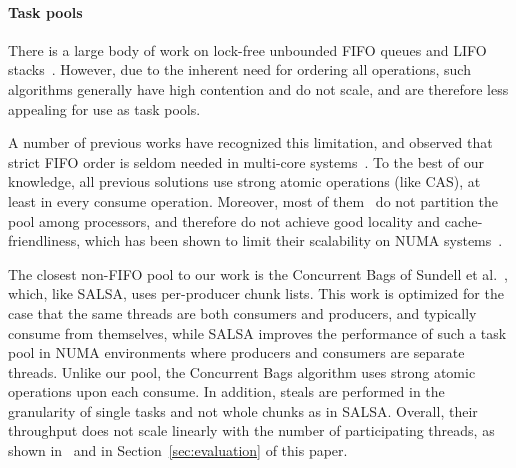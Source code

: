\paragraph{Task pools}
There is a large body of work on lock-free unbounded FIFO queues and LIFO
stacks~\cite{Gidenstam:2010:CLQ:1940234.1940266,Hendler:2004:SLS:1007912.1007944,
Hoffman:2007:BQ:1782394.1782423, Michael:1996:SFP:248052.248106,Moir:2005:UEI:1073970.1074013}.
However, due to the inherent need for ordering all operations, such algorithms
generally have high contention and do not scale, and are therefore less appealing for use as task pools. 

A number of previous works have recognized this limitation, and observed that strict FIFO
order is seldom needed in multi-core systems~\cite{Afek:2010:SPP:1885276.1885295,springerlink:10.1007/978-3-642-17653-1_29,
Basin:2011:CST:2075029.2075087,Sundell:2011:LAC:1989493.1989550}. To the best of our knowledge, all previous 
solutions use strong atomic operations (like CAS), at least in every consume operation. Moreover, most of
them~\cite{Afek:2010:SPP:1885276.1885295,springerlink:10.1007/978-3-642-17653-1_29,
Basin:2011:CST:2075029.2075087} do not partition the pool among processors, and therefore do not achieve
good locality and cache-friendliness, which has been shown to limit their scalability on NUMA systems~\cite{Basin:Thesis:2011}.

The closest non-FIFO pool to our work is the Concurrent Bags of
Sundell et al.~\cite{Sundell:2011:LAC:1989493.1989550}, which, like SALSA, uses 
per-producer chunk lists. 
This work is optimized for the case that the same threads are both consumers and producers, and typically consume from themselves, while SALSA improves the performance of such a task pool in NUMA environments where producers and consumers are separate threads.
Unlike our pool, the Concurrent Bags algorithm uses strong atomic operations
upon each consume. In addition, steals are performed in the granularity of single tasks and
not whole chunks as in SALSA. Overall, their throughput does not scale linearly with the number of participating threads,
as shown in~\cite{Sundell:2011:LAC:1989493.1989550} and in Section~\ref{sec:evaluation} of this paper.

